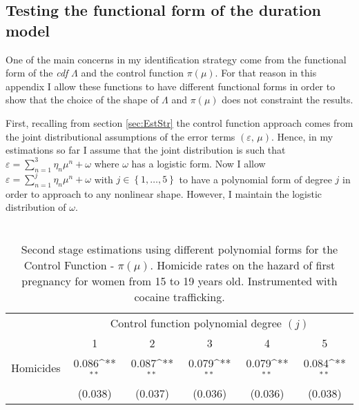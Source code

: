 \documentclass[a4paper,10pt,twocolumn,preprint,3p,authoryear]{elsarticle}
\def\sym#1{\ifmmode^{#1}\else\(^{#1}\)\fi}
\begin{document}
\begin{appendix}

\section{Testing the functional form of the duration model\label{App:FunctForm}}

One of the main concerns in my identification strategy come from the functional form of the \emph{cdf} $\Lambda$ and the control function $\pi\left( \mu \right)$.  For that reason in this appendix I allow these functions to have different functional forms in order to show that the choice of the shape of $\Lambda$ and $\pi\left( \mu \right)$ does not constraint the results.

First, recalling from section \ref{sec:EstStr} the control function approach comes from the joint distributional assumptions of the error terms $\left(\varepsilon,\,\mu\right)$. Hence, in my estimations so far I assume that the joint distribution is such that $\varepsilon= \sum_{n=1}^{3}\eta_{n}\mu^{n} + \omega$ where $\omega$ has a logistic form. Now I allow  $\varepsilon= \sum_{n=1}^{j}\eta_{n}\mu^{n} + \omega$ with $j \in \left\{1, \dots, 5  \right\} $ to have a polynomial form of degree $j$ in order to approach to any nonlinear shape. However, I maintain the logistic distribution of $\omega$. 

\begin{table}[h]
	\caption{\\
		Second stage estimations using different polynomial forms for the Control Function - $\pi\left( \mu \right)$. Homicide rates on the hazard of first pregnancy for women from 15 to 19 years old. Instrumented with cocaine trafficking.}
	\footnotesize	
	\begin{tabular}{lccccc}
		\hline
		& \multicolumn{5}{c}{{Control function polynomial degree $\left( j \right)$}} \\
		      &          1           &	                     2&	                     3&	                     4&	                     5 \\
		\hline
Homicides        &       0.086\sym{**} &	       0.087\sym{**} &	       0.079\sym{**} &	       0.079\sym{**} &	       0.084\sym{**} \\
            &     (0.038)         &	     (0.037)         &	     (0.036)         &	     (0.036)         &	     (0.038)         \\
			

\end{tabular}
\end{table}
\end{appendix}
\end{document}
